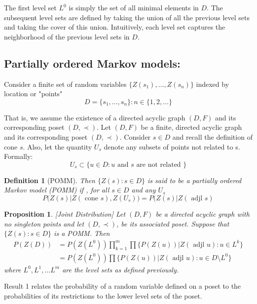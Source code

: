 \documentclass[11pt]{amsart}
\newtheorem{proposition}{Proposition}
\newtheorem{definition}{Definition}
\begin{document}
The first level set $L^0$ is simply the set of all minimal elements in $D$. The subsequent level sets are defined by taking the union of all the previous level sets and taking the cover of this union. Intuitively, each level set captures the neighborhood of the previous level sets in $D$.



\subsection{Partially ordered Markov models:}

Consider a finite set of random variables $\{ Z(s_1),\ldots,Z(s_n) \}$ indexed by location or "points" $$
D = \{s_1,\ldots ,s_n \}: n \in \{1,2,\ldots \}
$$

That is, we assume the existence of a directed acyclic graph $(D,F)$ and its corresponding poset $(D,\prec).$
Let $(D,F)$ be a finite, directed acyclic graph and its corresponding poset $(D,\prec).$ Consider $s \in D$ and recall the definition of cone $s$. Also, let the quantity $U_s$ denote any subsets of points not related to s. 
Formally:
$$
U_s \subset \{ u \in D: u \text{ and } s \text{ are not related } \}
$$
\begin{definition}[POMM]
Then $\{ Z(s): s \in D \}$ is said to be a partially ordered Markov model (POMM) if , for all $s \in D$ and any $U_s$
\begin{equation}
P(Z(s)|Z(\text{ cone } s), Z(U_s)) = P(Z(s)|Z(\text{ adjl } s)
\end{equation}
\end{definition}
\begin{proposition}\label{eq:result1}[Joint Distribution]
Let $(D,F)$ be a directed acyclic graph with no singleton points and let $(D, \prec)$, be its associated poset. Suppose that $\{Z(s): s \in D\}$ is a POMM. Then 
\begin{align}
P(Z(D)) &= P(Z(L^0)) \prod_{k=1}^m \prod \{ P(Z(u))| Z(\text{ adjl } u): u \in L^k \} \\
&= P(Z(L^0)) \prod \{ P(Z(u))| Z(\text{ adjl } u): u \in D 
\setminus L^0 \}
\end{align}
where $L^0, L^1, \ldots L^m$ are the level sets as defined previously.
\end{proposition}







Result 1 relates the probability of a random variable defined on a poset to the probabilities of its restrictions to the lower level sets of the poset.
\end{document}

